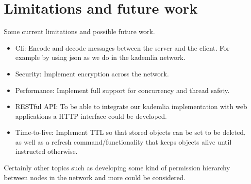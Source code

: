 \section{Limitations and future work}\label{sec:limitations and future work}
Some current limitations and possible future work.

\begin{itemize}
  \item Cli: Encode and decode messages between the server and the client.
For example by using json as we do in the kademlia network.
  \item Security: Implement encryption across the network.
  \item Performance: Implement full support for concurrency and thread safety.
  \item RESTful API: To be able to integrate our kademlia implementation
with web applications a HTTP interface could be developed.
  \item Time-to-live: Implement TTL so that stored objects can be set to be deleted,
as well as a refresh command/functionality that keeps objects alive until instructed
otherwise.
\end{itemize}

Certainly other topics such as developing some kind of permission hierarchy between nodes in the network and more could be considered.
